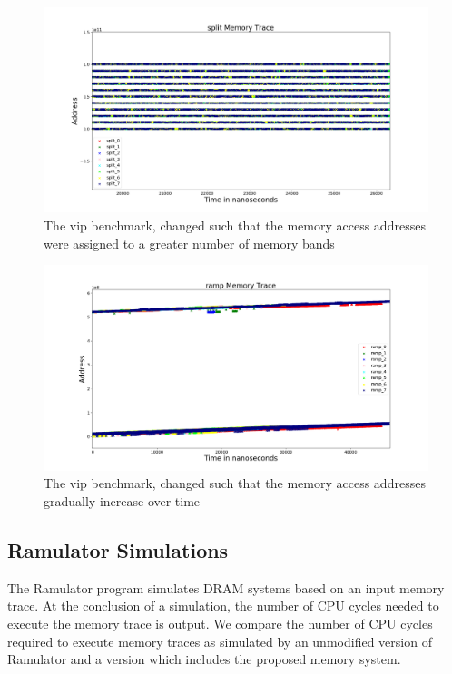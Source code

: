 \begin{figure}[h!]
		\includegraphics[width=\linewidth]{figures/vips_split.png}
		\caption{The vip benchmark, changed such that the memory access addresses were assigned to a greater number of memory bands}
		\label{fig:vips_split}
\end{figure}

\begin{figure}[h!]
		\includegraphics[width=\linewidth]{figures/vips_ramp.png}
		\caption{The vip benchmark, changed such that the memory access addresses gradually increase over time}
		\label{fig:vips_ramp}
\end{figure}

\subsection{Ramulator Simulations}
The Ramulator program simulates DRAM systems based on an input memory trace. At the conclusion of a simulation, the number of CPU cycles needed to execute the memory trace is output. We compare the number of CPU cycles required to execute memory traces as simulated by an unmodified version of Ramulator and a version which includes the proposed memory system.


